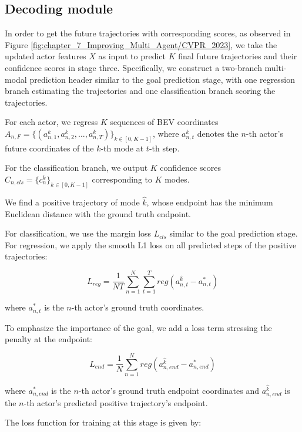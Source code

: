\subsection{Decoding module}
\label{subsec:7_improving_efficiency_decoding_module}

In order to get the future trajectories with corresponding scores, as observed in Figure \ref{fig:chapter_7_Improving_Multi_Agent/CVPR_2023}, we take the updated actor features $X$ as input to predict $K$ final future trajectories and their confidence scores in stage three. 
Specifically, we construct a two-branch multi-modal prediction header similar to the goal prediction stage, with one regression branch estimating the trajectories and one classification branch scoring the trajectories.

For each actor, we regress $K$ sequences of \ac{BEV} coordinates 
$A_{n,F}=\{(a_{n,1}^k,a_{n,2}^k,...,a_{n,T}^k)\}_{k \in [0,K-1]}$,
where $a_{n,t}^k$ denotes the $n$-th actor's future coordinates of the $k$-th mode at $t$-th step. 

For the classification branch, we output $K$ confidence scores $    C_{n,cls} = \{c_n^k\}_{k \in [0,K-1]}
$ corresponding to $K$ modes.

We find a positive trajectory of mode $\hat{k}$, whose endpoint has the minimum Euclidean distance with the ground truth endpoint.

For classification, we use the margin loss  $L_{cls}$ similar to the goal prediction stage. 
For regression, we apply the smooth L1 loss on all predicted steps of the positive trajectories:

\begin{equation}
	L_{reg}=\frac{1}{NT}\sum_{n=1}^N\sum_{t=1}^T{reg(a_{n,t}^{\hat{k}}-a^{*}_{n,t})}
\end{equation}

where $a^{*}_{n,t}$ is the $n$-th actor's ground truth coordinates.

To emphasize the importance of the goal, we add a loss term stressing the penalty at the endpoint:

\begin{equation}
	L_{end}=\frac{1}{N}\sum_{n=1}^N{reg(a_{n,end}^{\hat{k}}-a^{*}_{n,end})}
\end{equation}

where $a^{*}_{n,end}$ is the $n$-th actor's ground truth endpoint coordinates and $a_{n,end}^{\hat{k}}$ is the $n$-th actor's predicted positive trajectory's endpoint.

The loss function for training at this stage is given by:

